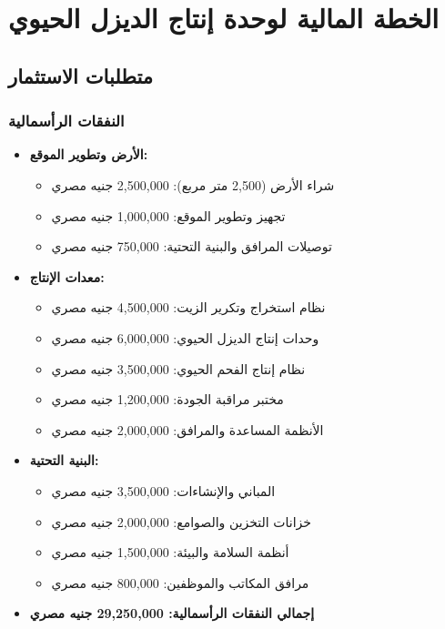 \section{الخطة المالية لوحدة إنتاج الديزل الحيوي}

\subsection{متطلبات الاستثمار}

\subsubsection{النفقات الرأسمالية}
\begin{itemize}
    \item \textbf{الأرض وتطوير الموقع:}
    \begin{itemize}
        \item شراء الأرض (2,500 متر مربع): 2,500,000 جنيه مصري
        \item تجهيز وتطوير الموقع: 1,000,000 جنيه مصري
        \item توصيلات المرافق والبنية التحتية: 750,000 جنيه مصري
    \end{itemize}
    
    \item \textbf{معدات الإنتاج:}
    \begin{itemize}
        \item نظام استخراج وتكرير الزيت: 4,500,000 جنيه مصري
        \item وحدات إنتاج الديزل الحيوي: 6,000,000 جنيه مصري
        \item نظام إنتاج الفحم الحيوي: 3,500,000 جنيه مصري
        \item مختبر مراقبة الجودة: 1,200,000 جنيه مصري
        \item الأنظمة المساعدة والمرافق: 2,000,000 جنيه مصري
    \end{itemize}
    
    \item \textbf{البنية التحتية:}
    \begin{itemize}
        \item المباني والإنشاءات: 3,500,000 جنيه مصري
        \item خزانات التخزين والصوامع: 2,000,000 جنيه مصري
        \item أنظمة السلامة والبيئة: 1,500,000 جنيه مصري
        \item مرافق المكاتب والموظفين: 800,000 جنيه مصري
    \end{itemize}
    
    \item \textbf{إجمالي النفقات الرأسمالية: 29,250,000 جنيه مصري}
\end{itemize}

